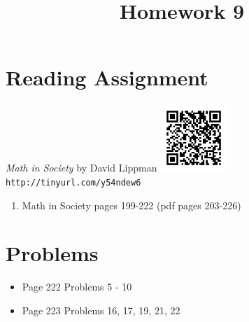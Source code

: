 \documentclass{article}
\title{Homework 9}
\date{}
\begin{document}
\maketitle

\section*{Reading Assignment}
\begin{center}
    {\em Math in Society} by David Lippman\newline
    \includegraphics[width=1in]{readings/society}\newline
    {\tt http://tinyurl.com/y54ndew6}
\end{center}
\begin{enumerate}
\item Math in Society pages 199-222 (pdf pages 203-226)
\end{enumerate}

\section*{Problems}
\begin{itemize}
    \item Page 222 Problems 5 - 10
    \item Page 223 Problems 16, 17, 19, 21, 22
\end{itemize}
\end{document}
